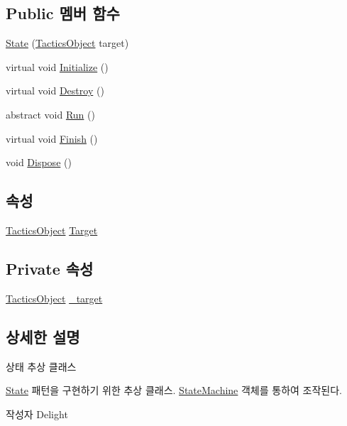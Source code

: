 \subsection*{Public 멤버 함수}
\begin{DoxyCompactItemize}
\item 
\hyperlink{class_m_c_n_1_1_state_ad16fc582097e88164f2804183830344e}{State} (\hyperlink{class_tactics_object}{Tactics\+Object} target)
\item 
virtual void \hyperlink{class_m_c_n_1_1_state_a5be59bc891e64cbbe4322d74a6746908}{Initialize} ()
\item 
virtual void \hyperlink{class_m_c_n_1_1_state_aebf48ef248bbf185d6aae91d9789459e}{Destroy} ()
\item 
abstract void \hyperlink{class_m_c_n_1_1_state_afdec72a816a8a8ec584cac758a027215}{Run} ()
\item 
virtual void \hyperlink{class_m_c_n_1_1_state_a2492ca731678b8216c02134dddeeb745}{Finish} ()
\item 
void \hyperlink{class_m_c_n_1_1_state_af6df0477e0dead784489688cb2c2093e}{Dispose} ()
\end{DoxyCompactItemize}
\subsection*{속성}
\begin{DoxyCompactItemize}
\item 
\hyperlink{class_tactics_object}{Tactics\+Object} \hyperlink{class_m_c_n_1_1_state_a79a563b32f183c9adc9a96679fc57eb8}{Target}
\end{DoxyCompactItemize}
\subsection*{Private 속성}
\begin{DoxyCompactItemize}
\item 
\hyperlink{class_tactics_object}{Tactics\+Object} \hyperlink{class_m_c_n_1_1_state_a13fe398868da354cfde9ff644e12e9f2}{\+\_\+target}
\end{DoxyCompactItemize}


\subsection{상세한 설명}
상태 추상 클래스 

\hyperlink{class_m_c_n_1_1_state}{State} 패턴을 구현하기 위한 추상 클래스. \hyperlink{class_m_c_n_1_1_state_machine}{State\+Machine} 객체를 통하여 조작된다. \begin{DoxyAuthor}{작성자}
Delight 
\end{DoxyAuthor}



